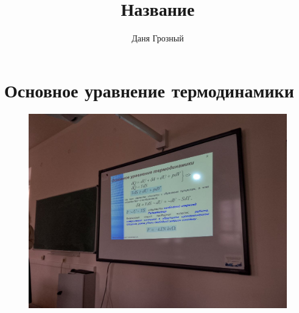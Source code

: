 \documentclass{article}
\title{Название}
\author{Даня Грозный}
\begin{document}
\section{Основное уравнение термодинамики}
\begin{figure}[H]
    \includegraphics[width=\textwidth]{1.jpg}
\end{figure}
\end{document}
